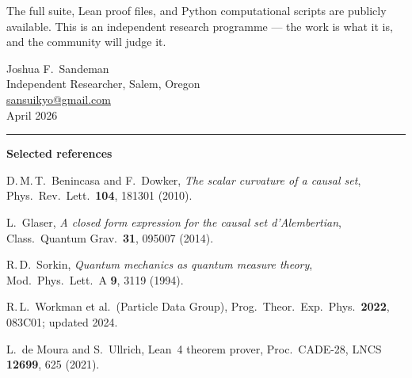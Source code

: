 \documentclass[11pt]{article}
\begin{document}
\bigskip
\noindent The full suite, Lean proof files, and Python computational
scripts are publicly available. This is an independent research programme
— the work is what it is, and the community will judge it.

\begin{flushright}
Joshua F.\ Sandeman\\
Independent Researcher, Salem, Oregon\\
\href{mailto:sansuikyo@gmail.com}{sansuikyo@gmail.com}\\
April 2026
\end{flushright}

\bigskip
\hrule
\bigskip

\begingroup
\small
\noindent\textbf{Selected references}

\noindent
[BDG2010] D.\,M.\,T.\ Benincasa and F.\ Dowker,
\textit{The scalar curvature of a causal set},
Phys.\ Rev.\ Lett.\ \textbf{104}, 181301 (2010).

\noindent
[Glaser2014] L.\ Glaser,
\textit{A closed form expression for the causal set d'Alembertian},
Class.\ Quantum Grav.\ \textbf{31}, 095007 (2014).

\noindent
[Sorkin1994] R.\,D.\ Sorkin,
\textit{Quantum mechanics as quantum measure theory},
Mod.\ Phys.\ Lett.\ A \textbf{9}, 3119 (1994).

\noindent
[PDG2024] R.\,L.\ Workman et al.\ (Particle Data Group),
Prog.\ Theor.\ Exp.\ Phys.\ \textbf{2022}, 083C01; updated 2024.

\noindent
[Lean4] L.\ de Moura and S.\ Ullrich, Lean~4 theorem prover,
Proc.\ CADE-28, LNCS \textbf{12699}, 625 (2021).
\endgroup
\end{document}
